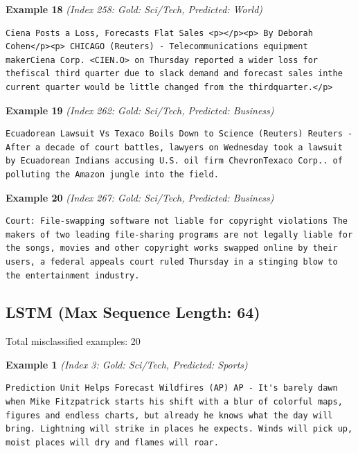 \noindent
\textbf{Example 18} \quad \textit{(Index 258: Gold: Sci/Tech, Predicted: World)}

\begin{Verbatim}[breaklines=true,breakanywhere=true,fontsize=\small]
Ciena Posts a Loss, Forecasts Flat Sales <p></p><p> By Deborah Cohen</p><p> CHICAGO (Reuters) - Telecommunications equipment makerCiena Corp. <CIEN.O> on Thursday reported a wider loss for thefiscal third quarter due to slack demand and forecast sales inthe current quarter would be little changed from the thirdquarter.</p>
\end{Verbatim}

\noindent
\textbf{Example 19} \quad \textit{(Index 262: Gold: Sci/Tech, Predicted: Business)}

\begin{Verbatim}[breaklines=true,breakanywhere=true,fontsize=\small]
Ecuadorean Lawsuit Vs Texaco Boils Down to Science (Reuters) Reuters - After a decade of court battles, lawyers on Wednesday took a lawsuit by Ecuadorean Indians accusing U.S. oil firm ChevronTexaco Corp.. of polluting the Amazon jungle into the field.
\end{Verbatim}

\noindent
\textbf{Example 20} \quad \textit{(Index 267: Gold: Sci/Tech, Predicted: Business)}

\begin{Verbatim}[breaklines=true,breakanywhere=true,fontsize=\small]
Court: File-swapping software not liable for copyright violations The makers of two leading file-sharing programs are not legally liable for the songs, movies and other copyright works swapped online by their users, a federal appeals court ruled Thursday in a stinging blow to the entertainment industry.
\end{Verbatim}

\subsection{LSTM (Max Sequence Length: 64)}
\label{app:run4}

Total misclassified examples: 20

\noindent
\textbf{Example 1} \quad \textit{(Index 3: Gold: Sci/Tech, Predicted: Sports)}

\begin{Verbatim}[breaklines=true,breakanywhere=true,fontsize=\small]
Prediction Unit Helps Forecast Wildfires (AP) AP - It's barely dawn when Mike Fitzpatrick starts his shift with a blur of colorful maps, figures and endless charts, but already he knows what the day will bring. Lightning will strike in places he expects. Winds will pick up, moist places will dry and flames will roar.
\end{Verbatim}

